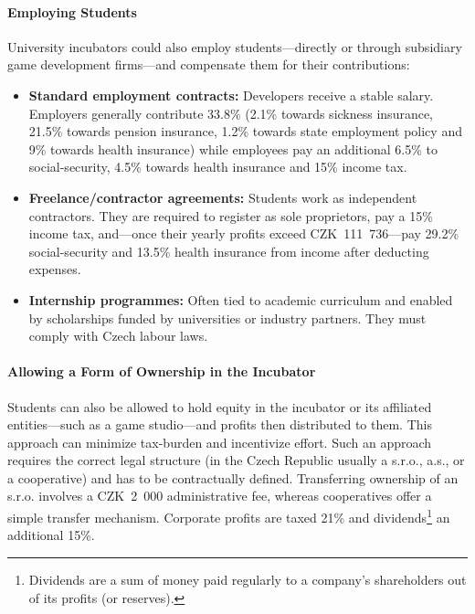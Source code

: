 \paragraph{Employing Students}
University incubators could also employ students—directly or through subsidiary game development firms—and compensate them for their contributions:
\begin{itemize}
    \item \textbf{Standard employment contracts:} Developers receive a stable salary. Employers generally contribute 33.8\% (2.1\% towards sickness insurance, 21.5\% towards pension insurance, 1.2\% towards state employment policy and 9\% towards health insurance) while employees pay an additional 6.5\% to social-security, 4.5\% towards health insurance and 15\% income tax. \cite{lano-payroll, mpsv-social-sec}
    \item \textbf{Freelance/contractor agreements:} Students work as independent contractors. They are required to register as sole proprietors, pay a 15\% income tax, and—once their yearly profits exceed CZK~111~736—pay 29.2\% social-security and 13.5\% health insurance from income after deducting expenses. \cite{fakturoid-osvc, Zapletalova-osvc, lano-payroll, mpsv-social-sec}
    \item \textbf{Internship programmes:} Often tied to academic curriculum and enabled by scholarships funded by universities or industry partners. They must comply with Czech labour laws.
\end{itemize}

\paragraph{Allowing a Form of Ownership in the Incubator}
Students can also be allowed to hold equity in the incubator or its affiliated entities—such as a game studio—and profits then distributed to them. This approach can minimize tax-burden and incentivize effort. Such an approach requires the correct legal structure (in the Czech Republic usually a s.r.o., a.s., or a cooperative) and has to be contractually defined. Transferring ownership of an s.r.o. involves a CZK~2~000 administrative fee, whereas cooperatives offer a simple transfer mechanism. Corporate profits are taxed 21\% and dividends\footnote{Dividends are a sum of money paid regularly to a company’s shareholders out of its profits (or reserves).} an additional 15\%.
\cite{vajda-llc}

